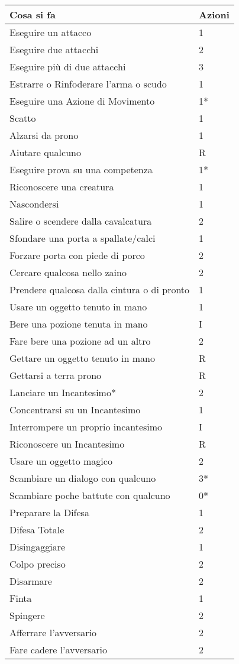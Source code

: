 \documentclass[a4paper,12 pt,openany]{book}
\begin{document}
\begin{textblock*}{8.3cm}
\noindent\begin{tabular}{ll}
	\textbf{Cosa si fa} & \textbf{Azioni}\\
	\hline
Eseguire un attacco& 1\\
Eseguire due attacchi& 2\\
Eseguire più di due attacchi& 3\\
Estrarre o Rinfoderare l'arma o scudo& 1\\
\hline
Eseguire una Azione di Movimento &1*\\
Scatto & 1\\
Alzarsi da prono& 1\\
\hline
Aiutare qualcuno& R\\
Eseguire prova su una competenza& 1*\\
Riconoscere una creatura& 1\\
Nascondersi& 1\\
\hline
Salire o scendere dalla cavalcatura& 2\\
Sfondare una porta a spallate/calci& 1\\
Forzare porta con piede di porco& 2\\
\hline
Cercare qualcosa nello zaino& 2\\
Prendere qualcosa dalla cintura o di pronto & 1\\
Usare un oggetto tenuto in mano& 1\\
\hline
Bere una pozione tenuta in mano& I\\
Fare bere una pozione ad un altro & 2\\
\hline
Gettare un oggetto tenuto in mano& R\\
Gettarsi a terra prono& R\\
\hline
Lanciare un Incantesimo*& 2\\
Concentrarsi su un Incantesimo& 1\\
Interrompere un proprio incantesimo & I\\
Riconoscere un Incantesimo& R\\
Usare un oggetto magico& 2\\
\hline
Scambiare un dialogo con qualcuno& 3*\\
Scambiare poche battute con qualcuno& 0*\\
\hline
Preparare la Difesa & 1\\
Difesa Totale & 2\\
Disingaggiare & 1\\
Colpo preciso & 2\\
\hline
Disarmare & 2\\
Finta & 1\\
Spingere & 2\\
Afferrare l'avversario & 2\\
Fare cadere l'avversario & 2
\end{tabular}


\end{textblock*}
\end{document}
